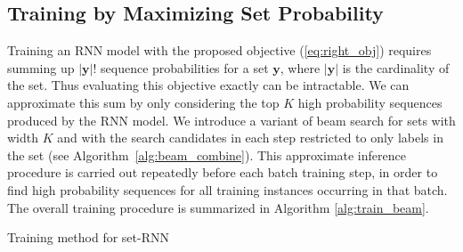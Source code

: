 \subsection{Training by Maximizing Set Probability}
Training an RNN model with the proposed objective (\ref{eq:right_obj}) requires summing up $|\mathbf{y}|!$  sequence probabilities for a set $\mathbf{y}$, where $|\mathbf{y}|$ is the cardinality of the set.  Thus evaluating this objective exactly can be intractable. We can approximate this sum by only considering the top $K$ high probability sequences produced by the RNN model. We introduce a variant of beam search for sets with width $K$ and with the search candidates in each step restricted to only labels in the set (see Algorithm~\ref{alg:beam_combine}). This approximate inference procedure is carried out repeatedly before each batch training step, in order to find high probability sequences for all training instances occurring in that batch. The overall training procedure is summarized in Algorithm \ref{alg:train_beam}.%

\begin{algorithm}

    
    \caption{Training method for set-RNN}
    \label{alg:train_beam}
\end{algorithm}


